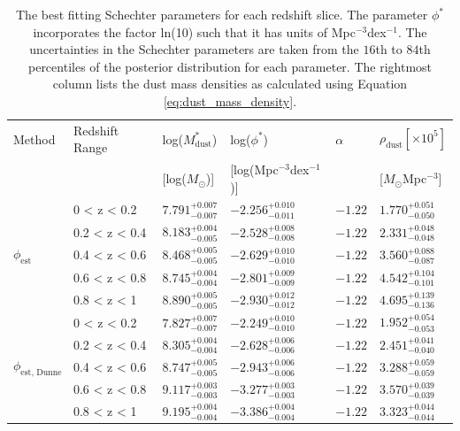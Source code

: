 \begin{table}
    \centering
    \begin{tabular}{p{2cm}|p{2.5cm}|p{2cm}|p{3cm}|p{1.5cm}|p{2cm}}
        \hline
        \hline
        Method & Redshift Range & log($M_{\textrm{dust}}^*$) & log($\phi^*$) & $\alpha$ & $\rho_{\textrm{dust}} [\times10^5]$ \\
        & & [log($M_{\odot}$)] & [log(Mpc$^{-3}$dex$^{-1}$)] & & [$M_{\odot}$Mpc$^{-3}$] \\
        \hline
        \hline
        \multirow{5}{*}{$\phi_{\textrm{est}}$} & 0 < z < 0.2 & $7.791^{+0.007}_{-0.007}$ & $-2.256^{+0.010}_{-0.011}$ & $-1.22$ & $1.770^{+0.051}_{-0.050}$ \\
        & 0.2 < z < 0.4 & $8.183^{+0.004}_{-0.005}$ & $-2.528^{+0.008}_{-0.008}$ & $-1.22$ & $2.331^{+0.048}_{-0.048}$ \\
        & 0.4 < z < 0.6 & $8.468^{+0.005}_{-0.005}$ & $-2.629^{+0.010}_{-0.010}$ & $-1.22$ & $3.560^{+0.088}_{-0.087}$ \\
        & 0.6 < z < 0.8 & $8.745^{+0.004}_{-0.004}$ & $-2.801^{+0.009}_{-0.009}$ & $-1.22$ & $4.542^{+0.104}_{-0.101}$ \\
        & 0.8 < z < 1 & $8.890^{+0.005}_{-0.005}$ & $-2.930^{+0.012}_{-0.012}$ & $-1.22$ & $4.695^{+0.139}_{-0.136}$ \\
        \hline
        \multirow{5}{*}{$\phi_{\textrm{est, Dunne}}$} & 0 < z < 0.2 & $7.827^{+0.007}_{-0.007}$ & $-2.249^{+0.010}_{-0.010}$ & $-1.22$ & $1.952^{+0.054}_{-0.053}$ \\
        & 0.2 < z < 0.4 & $8.305^{+0.004}_{-0.004}$ & $-2.628^{+0.006}_{-0.006}$ & $-1.22$ & $2.451^{+0.041}_{-0.040}$ \\
        & 0.4 < z < 0.6 & $8.747^{+0.005}_{-0.005}$ & $-2.943^{+0.006}_{-0.006}$ & $-1.22$ & $3.288^{+0.059}_{-0.059}$ \\
        & 0.6 < z < 0.8 & $9.117^{+0.003}_{-0.003}$ & $-3.277^{+0.003}_{-0.003}$ & $-1.22$ & $3.570^{+0.039}_{-0.039}$ \\
        & 0.8 < z < 1 & $9.195^{+0.004}_{-0.004}$ & $-3.386^{+0.004}_{-0.004}$ & $-1.22$ & $3.323^{+0.044}_{-0.044}$ \\
        \hline
    \end{tabular}
    \caption[Best fitting Schechter parameters of our SGP DMFs in each redshift slice]{The best fitting Schechter parameters for each redshift slice. The parameter $\phi^*$ incorporates the factor \textrm{ln}(10) such that it has units of Mpc$^{-3}$dex$^{-1}$. The uncertainties in the Schechter parameters are taken from the $16$th to $84$th percentiles of the posterior distribution for each parameter. The rightmost column lists the dust mass densities as calculated using Equation \ref{eq:dust_mass_density}.}
    \label{tab:schechter_parameters}
\end{table}

